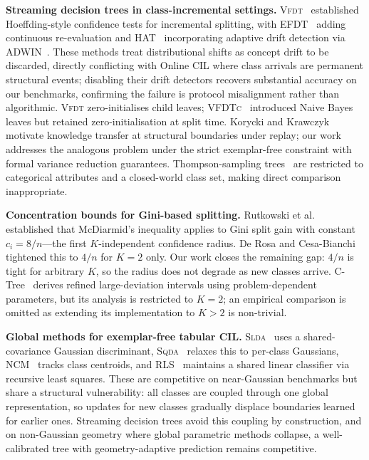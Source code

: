 \documentclass{article}
\newcommand{\vfdt}{\textsc{Vfdt}}
\newcommand{\slda}{\textsc{Slda}}
\newcommand{\sqda}{\textsc{Sqda}}
\begin{document}
\noindent
\textbf{Streaming decision trees in class-incremental settings.}
\vfdt{}~\cite{DomingosHulten2000} established Hoeffding-style confidence tests for incremental splitting, with EFDT~\cite{ManapragadaWebbSalehi2018} adding continuous re-evaluation and HAT~\cite{BifetGavalda2009HAT} incorporating adaptive drift detection via ADWIN~\cite{BifetGavalda2007ADWIN}. These methods treat distributional shifts as concept drift to be discarded, directly conflicting with Online CIL where class arrivals are permanent structural events; disabling their drift detectors recovers substantial accuracy on our benchmarks, confirming the failure is protocol misalignment rather than algorithmic. \vfdt{} zero-initialises child leaves; \textsc{VFDTc}~\citep{Gama2003} introduced Naive Bayes leaves but retained zero-initialisation at split time. Korycki and Krawczyk~\cite{korycki2021} motivate knowledge transfer at structural boundaries under replay; our work addresses the analogous problem under the strict exemplar-free constraint with formal variance reduction guarantees. Thompson-sampling trees~\cite{chaouki2024} are restricted to categorical attributes and a closed-world class set, making direct comparison inappropriate.

\noindent
\textbf{Concentration bounds for Gini-based splitting.}
Rutkowski et al.~\cite{rutkowski2013} established that McDiarmid's inequality applies to Gini split gain with constant $c_i = 8/n$---the first $K$-independent confidence radius. De Rosa and Cesa-Bianchi~\cite{derosa2015splitting} tightened this to $4/n$ for $K=2$ only. Our work closes the remaining gap: $4/n$ is tight for arbitrary $K$, so the radius does not degrade as new classes arrive. C-Tree~\cite{derosa2015splitting} derives refined large-deviation intervals using problem-dependent parameters, but its analysis is restricted to $K=2$; an empirical comparison is omitted as extending its implementation to $K>2$ is non-trivial.

\noindent
\textbf{Global methods for exemplar-free tabular CIL.}
\slda{}~\cite{hayes2020lifelong} uses a shared-covariance Gaussian discriminant, \sqda{}~\cite{hayes2020lifelong} relaxes
this to per-class Gaussians, NCM~\cite{mensink2013} tracks class centroids, and
RLS~\cite{zhuang2022acil} maintains a shared linear classifier via
recursive least squares. These are competitive on near-Gaussian
benchmarks but share a structural vulnerability: all classes are coupled
through one global representation, so updates for new classes gradually
displace boundaries learned for earlier ones. Streaming decision trees
avoid this coupling by construction, and on non-Gaussian geometry where
global parametric methods collapse, a well-calibrated tree with
geometry-adaptive prediction remains competitive.
\end{document}
